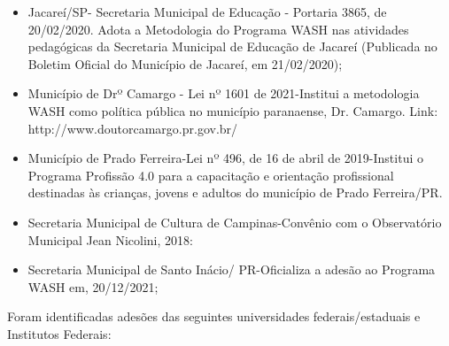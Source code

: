 \begin{itemize}
\item Jacareí/SP- Secretaria Municipal de Educação - Portaria 3865, de 20/02/2020. Adota a Metodologia do Programa WASH nas atividades pedagógicas da Secretaria Municipal de Educação de Jacareí (Publicada no Boletim Oficial do Município de Jacareí, em 21/02/2020);
\item Município de Drº Camargo - Lei nº 1601 de 2021-Institui a metodologia WASH como política pública no município paranaense, Dr. Camargo. Link: http://www.doutorcamargo.pr.gov.br/
\item Município de Prado Ferreira-Lei nº 496, de 16 de abril de 2019-Institui o Programa Profissão 4.0 para a capacitação e orientação profissional destinadas às crianças, jovens e adultos do município de Prado Ferreira/PR.
\item Secretaria Municipal de Cultura de Campinas-Convênio com o Observatório Municipal Jean Nicolini, 2018:
\item Secretaria Municipal de Santo Inácio/ PR-Oficializa a adesão ao Programa WASH em, 20/12/2021;
\end{itemize}

Foram identificadas adesões das seguintes universidades federais/estaduais e Institutos Federais:



